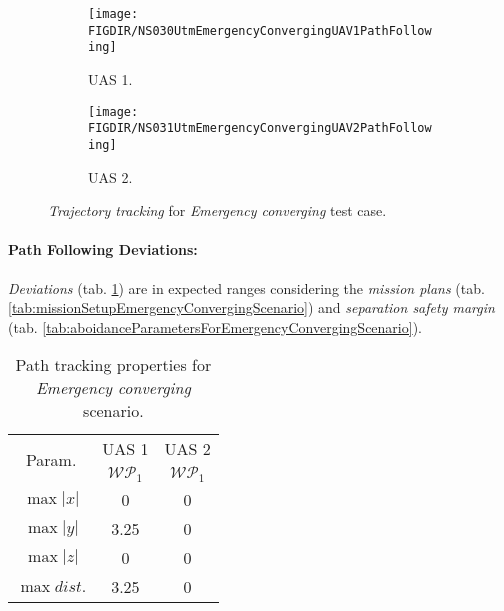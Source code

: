 \begin{figure}[H]
    \centering
    \begin{subfigure}{0.48\textwidth}
    	\centering
        \texttt{[image: \\FIGDIR/NS030UtmEmergencyConvergingUAV1PathFollowing]}
        \caption{UAS 1.}
        \label{fig:emergencyConvergingUAS1PathTracking}
    \end{subfigure}
    \begin{subfigure}{0.48\textwidth}
	    \centering
        \texttt{[image: \\FIGDIR/NS031UtmEmergencyConvergingUAV2PathFollowing]} 
        \caption{UAS 2.}
        \label{fig:emergencyCovnergingUAS2PathTracking}
    \end{subfigure}
    \caption{\emph{Trajectory tracking} for \emph{Emergency converging} test case. }
    \label{fig:emergencyConvergingTrajectoryTrackingPerformance}
\end{figure}

\paragraph{Path Following Deviations:} \emph{Deviations} (tab. \ref{tab:pathTrackingParametersForEmergencyConverging}) are in expected ranges considering the  \emph{mission plans} (tab. \ref{tab:missionSetupEmergencyConvergingScenario}) and \emph{separation safety margin} (tab. \ref{tab:aboidanceParametersForEmergencyConvergingScenario}).
    
\begin{table}[H]
    \centering
    \begin{tabular}{c||c|c}
        \multirow{2}{*}{Param.} & UAS 1     & UAS 2\\\cline{2-3}
                        & $\mathscr{WP}_1$  & $\mathscr{WP}_1$\\\hline\hline
          $\max |x|$    & 0                 & 0 \\\hline
          $\max |y|$    & 3.25              & 0 \\\hline
          $\max |z|$    & 0                 & 0 \\\hline
          $\max dist.$  & 3.25              & 0 \\
    \end{tabular}
    \caption{Path tracking properties for \emph{Emergency converging} scenario.}
    \label{tab:pathTrackingParametersForEmergencyConverging}
\end{table}

\newpage
